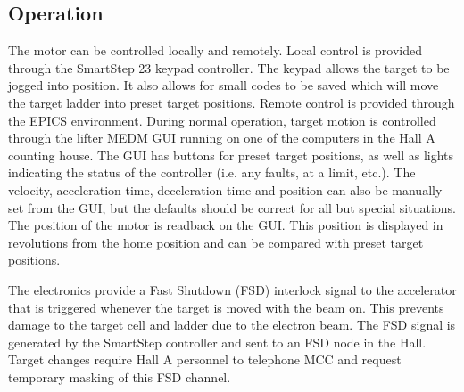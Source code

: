 {\subsection{Operation}
        The motor can be controlled locally and remotely.  Local control
is provided through the SmartStep 23 keypad controller.  The keypad 
allows the target to be jogged into position.  It also allows for small
codes to be saved which will move the target ladder into preset target
positions.  Remote control is provided through the EPICS environment.
During normal operation, target motion is controlled through the lifter
MEDM GUI running on one of the computers in the Hall A counting house.
The GUI has
buttons for preset target positions, as well as lights
indicating the status of the controller (i.e. any faults, at a limit, etc.).
The velocity, acceleration time, deceleration time and position can
also be manually set from the GUI, but the defaults should be correct
for all but special situations.  The position of the motor is readback
on the GUI.  This position is displayed in revolutions from the home
position and can be compared with preset target positions.  

        The electronics provide a Fast Shutdown (FSD) interlock signal 
to the accelerator that is triggered whenever the target is moved with
the beam on.  This prevents damage to the target
cell and ladder due to the electron beam.  The FSD signal is generated
by the SmartStep controller and sent to an FSD node in the Hall.
Target changes require Hall A personnel to telephone MCC and request
temporary masking of this FSD channel.
} %
